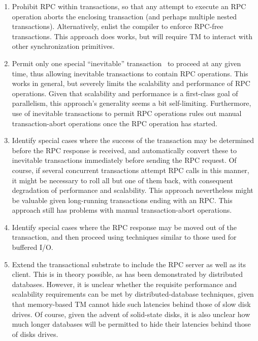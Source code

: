 \begin{enumerate}
\item	Prohibit RPC within transactions, so that any attempt to execute
	an RPC operation aborts the enclosing transaction (and perhaps
	multiple nested transactions).
	Alternatively, enlist the compiler to enforce RPC-free
	transactions.
	This approach does works, but will require TM to
	interact with other synchronization primitives.
\item	Permit only one special
	``inevitable'' transaction~\cite{SpearMichaelScott2008InevitableSTM}
	to proceed at any given time, thus allowing inevitable
	transactions to contain RPC operations.
	This works in general, but severely limits the scalability and
	performance of RPC operations.
	Given that scalability and performance is a first-class goal of
	parallelism, this approach's generality seems a bit self-limiting.
	Furthermore, use of inevitable transactions to permit RPC
	operations rules out manual transaction-abort operations
	once the RPC operation has started.
\item	Identify special cases where the success of the transaction may
	be determined before the RPC response is received, and
	automatically convert these to inevitable transactions immediately
	before sending the RPC request.
	Of course, if several concurrent transactions attempt RPC calls
	in this manner, it might be necessary to roll all but one of them
	back, with consequent degradation of performance and scalability.
	This approach nevertheless might be valuable given long-running
	transactions ending with an RPC.
	This approach still has problems with manual transaction-abort
	operations.
\item	Identify special cases where the RPC response may be moved out
	of the transaction, and then proceed using techniques similar
	to those used for buffered I/O.
\item	Extend the transactional substrate to include the RPC server as
	well as its client.
	This is in theory possible, as has been demonstrated by
	distributed databases.
	However, it is unclear whether the requisite performance and
	scalability requirements can be met by distributed-database
	techniques, given that memory-based TM cannot hide such latencies
	behind those of slow disk drives.
	Of course, given the advent of solid-state disks, it is also unclear
	how much longer databases will be permitted to hide their latencies
	behind those of disks drives.
\end{enumerate}

